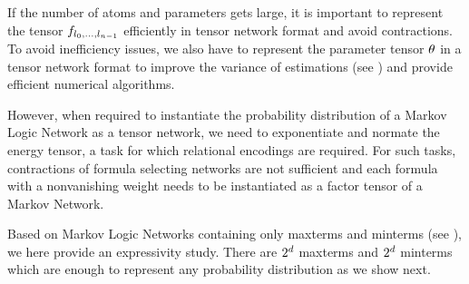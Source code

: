 If the number of atoms and parameters gets large, it is important to represent the tensor ${f_{l_{0},\ldots,l_{n-1}}}$ efficiently in tensor network format and avoid contractions.
To avoid inefficiency issues, we also have to represent the parameter tensor $\theta$ in a tensor network format to improve the variance of estimations (see ) and provide efficient numerical algorithms.

However, when required to instantiate the probability distribution of a Markov Logic Network as a tensor network, we need to exponentiate and normate the energy tensor, a task for which relational encodings are required.
For such tasks, contractions of formula selecting networks are not sufficient and each formula with a nonvanishing weight needs to be instantiated as a factor tensor of a Markov Network. 






\label{sec:MLNMaxMintermRep}

Based on Markov Logic Networks containing only maxterms and minterms (see ), we here provide an expressivity study.
There are $2^{d}$ maxterms and $2^{d}$ minterms which are enough to represent any probability distribution as we show next.

